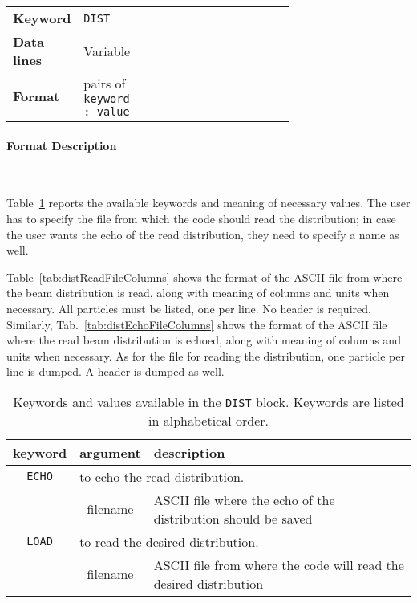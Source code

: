 \bigskip
\begin{tabular}{@{}llp{0.7\linewidth}}
    \textbf{Keyword}    & \texttt{DIST}\index{DIST} \\
    \textbf{Data lines} & Variable \\
    \textbf{Format}     & pairs of \texttt{keyword : value}
\end{tabular}

\paragraph{Format Description}~

Table~\ref{tab:distKeys} reports the available keywords and meaning of necessary values. The user has to specify the file from which the code should read the distribution; in case the user wants the echo of the read distribution, they need to specify a name as well.

Table~\ref{tab:distReadFileColumns} shows the format of the ASCII file from where the beam distribution is read, along with meaning of columns and units when necessary.
All particles must be listed, one per line.
No header is required.
Similarly, Tab.~\ref{tab:distEchoFileColumns} shows the format of the ASCII file where the read beam distribution is echoed, along with meaning of columns and units when necessary.
As for the file for reading the distribution, one particle per line is dumped.
A header is dumped as well.


\bigskip
\begin{center}
\begin{longtable}{|c|c|l|}%
    \caption{Keywords and values available in the \texttt{DIST} block. Keywords are listed in alphabetical order.}
    \label{tab:distKeys} \\*
    \hline
    \rowcolor{blue!30}
    keyword & argument & description \\*
    \hline
    \endfirsthead
    \texttt{ECHO} & \multicolumn{2}{l|}{to echo the read distribution.} \\*
                  & filename & ASCII file where the echo of the distribution should be saved \\*
    \hline

    \texttt{LOAD} & \multicolumn{2}{l|}{to read the desired distribution.} \\*
                  & filename & ASCII file from where the code will read the desired distribution \\*
    \hline
\end{longtable}
\end{center}


